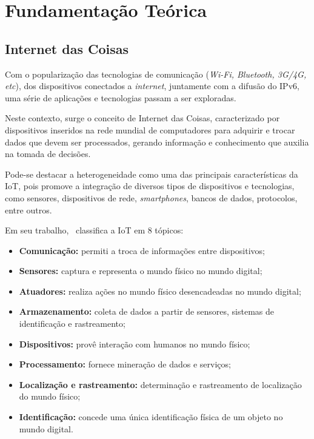 \chapter{Fundamentação Teórica}\label{capitulo:fundamentacao}

\section{Internet das Coisas}

Com o popularização das tecnologias de comunicação (\textit{Wi-Fi, \textit{Bluetooth}, 3G/4G, etc}), dos dispositivos conectados a \textit{internet}, juntamente com a difusão do IPv6, uma série de aplicações e tecnologias passam a ser exploradas.

Neste contexto, surge o conceito de Internet das Coisas, caracterizado por dispositivos inseridos na rede mundial de computadores para adquirir e trocar dados que devem ser processados, gerando informação e conhecimento que auxilia na tomada de decisões. 

Pode-se destacar a heterogeneidade como uma das principais características da IoT, pois promove a integração de diversos tipos de dispositivos e tecnologias, como sensores, dispositivos de rede, \textit{smartphones}, bancos de dados, protocolos, entre outros.

Em seu trabalho,~\citeauthor{mayer2009security} classifica a IoT em 8 tópicos:

\begin{itemize}
    \item \textbf{Comunicação:} permiti a troca de informações entre dispositivos;
    \item \textbf{Sensores:} captura e representa o mundo físico no mundo digital;
    \item \textbf{Atuadores:} realiza ações no mundo físico desencadeadas no mundo digital;
    \item \textbf{Armazenamento:} coleta de dados a partir de sensores, sistemas de identificação e rastreamento;
    \item \textbf{Dispositivos:} provê interação com humanos no mundo físico;
    \item \textbf{Processamento:} fornece mineração de dados e serviços;
    \item \textbf{Localização e rastreamento:} determinação e rastreamento de localização do mundo físico;
    \item \textbf{Identificação:} concede uma única identificação física de um objeto no mundo digital.
\end{itemize}

